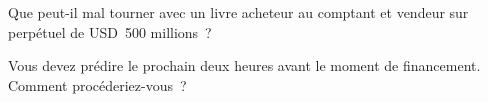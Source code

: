 \begin{interviewq}\label{iq:m3:perpetual-futures:5}
Que peut-il mal tourner avec un livre acheteur au comptant et vendeur sur perpétuel de USD~500 millions~?
\end{interviewq}

\begin{interviewq}\label{iq:m3:perpetual-futures:6}
Vous devez prédire le prochain  deux heures avant le moment de financement. Comment procéderiez-vous~?
\end{interviewq}
